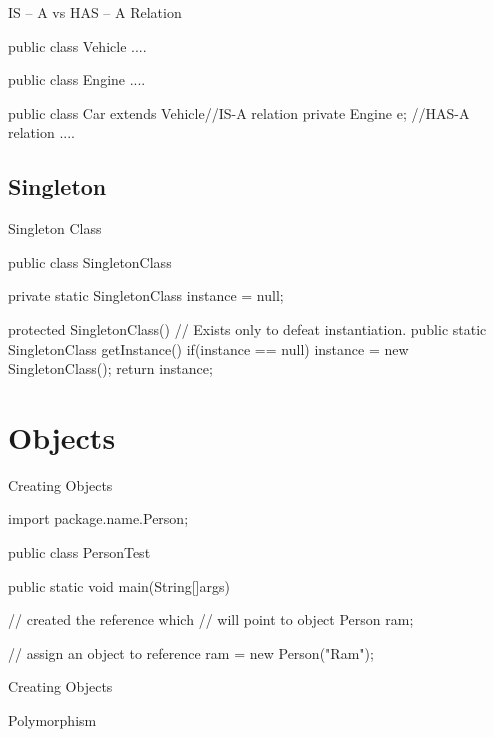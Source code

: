 \documentclass[11pt]{beamer}
\begin{document}
\begin{frame}[containsverbatim]{IS -- A vs HAS -- A Relation}
\begin{java}

public class Vehicle{
  ....
}

public class Engine{
  ....
}

public class Car extends Vehicle{//IS-A relation
  private Engine e;  //HAS-A relation
  ....
}
\end{java}
\end{frame}


\subsection{Singleton}
\begin{frame}[containsverbatim]{Singleton Class}
\begin{java}
public class SingletonClass{
private static SingletonClass instance = null;
	
	protected SingletonClass(){
		// Exists only to defeat instantiation.
	}
	public static SingletonClass getInstance(){
		if(instance == null){
			instance = new SingletonClass();
		}
		return instance;
	}
}
\end{java}
\end{frame}

\section{Objects}
\begin{frame}[containsverbatim]{Creating Objects}
\begin{java}
import package.name.Person;

public class PersonTest{

	public static void main(String[]args){
	
		// created the reference which 
		// will point to object
		Person ram;
		
		// assign an object to reference
		ram = new Person("Ram");
	}
}
\end{java}
\end{frame}

\begin{frame}[containsverbatim]{Creating Objects}
\begin{java}

\end{java}
\end{frame}


\begin{frame}[containsverbatim]{Polymorphism}

\end{frame}
\end{document}
